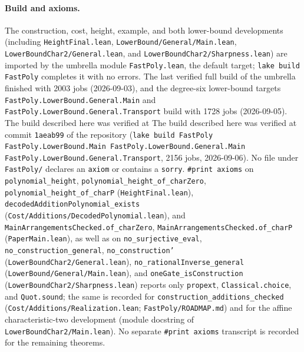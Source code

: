 \paragraph{Build and axioms.}
\begin{sloppypar}
The construction, cost, height, example, and both lower-bound
developments (including \texttt{HeightFinal.lean},
\texttt{LowerBound/\allowbreak General/\allowbreak Main.lean},
\texttt{LowerBoundChar2/\allowbreak General.lean}, and
\texttt{LowerBoundChar2/\allowbreak Sharpness.lean}) are imported by the umbrella
module \texttt{FastPoly.lean}, the default target; \texttt{lake build FastPoly}
completes it with no errors.  The last verified full build of the umbrella
finished with 2003 jobs (2026-09-03), and the degree-six lower-bound targets
\texttt{FastPoly.\allowbreak LowerBound.\allowbreak General.\allowbreak Main} and
\texttt{FastPoly.\allowbreak LowerBound.\allowbreak General.\allowbreak Transport}
build with 1728 jobs (2026-09-05).  The build described here was verified at
The build described here was verified at commit \texttt{1aeab99} of the repository (\texttt{lake build FastPoly FastPoly.LowerBound.Main FastPoly.LowerBound.General.Main FastPoly.LowerBound.General.Transport}, 2156 jobs, 2026-09-06). No file under \texttt{FastPoly/\allowbreak } declares an \texttt{axiom} or
contains a \texttt{sorry}.  \texttt{\#print axioms} on
\texttt{polynomial\_\allowbreak height}, \texttt{polynomial\_\allowbreak height\_\allowbreak of\_\allowbreak charZero},
\texttt{polynomial\_\allowbreak height\_\allowbreak of\_\allowbreak charP} (\texttt{HeightFinal.lean}),
\texttt{decodedAdditionPolynomial\_\allowbreak exists}
(\texttt{Cost/\allowbreak Additions/\allowbreak DecodedPolynomial.lean}), and
\texttt{MainArrangementsChecked.of\_\allowbreak charZero},
\texttt{MainArrangementsChecked.of\_\allowbreak charP} (\texttt{PaperMain.lean}), as well as on
\texttt{no\_\allowbreak surjective\_\allowbreak eval}, \texttt{no\_\allowbreak construction\_\allowbreak general},
\texttt{no\_\allowbreak construction'} (\texttt{LowerBoundChar2/\allowbreak General.lean}),
\texttt{no\_\allowbreak rationalInverse\_\allowbreak general}
(\texttt{LowerBound/\allowbreak General/\allowbreak Main.lean}), and
\texttt{oneGate\_\allowbreak isConstruction}
(\texttt{LowerBoundChar2/\allowbreak Sharpness.lean})
reports only \texttt{propext}, \texttt{Classical.choice}, and
\texttt{Quot.sound}; the same is recorded for
\texttt{construction\_\allowbreak additions\_\allowbreak checked}
(\texttt{Cost/\allowbreak Additions/\allowbreak Realization.lean};
\texttt{FastPoly/\allowbreak ROADMAP.md}) and for the affine characteristic-two
development (module docstring of \texttt{LowerBoundChar2/\allowbreak Main.lean}).
No separate \texttt{\#print axioms} transcript is recorded for the remaining
theorems.
\end{sloppypar}
